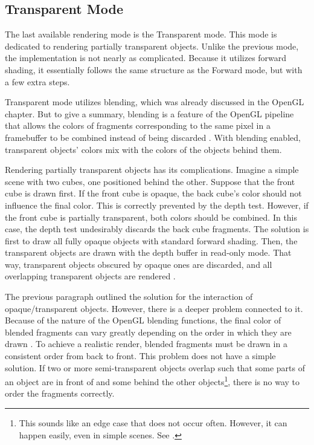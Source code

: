 \documentclass[
  digital,     %
  oneside,     %
  nosansbold,  %
  nocolorbold, %
  lof,         %
  lot,         %
]{fithesis4}
\begin{document}
\subsection{Transparent Mode}
The last available rendering mode is the Transparent mode. This mode is dedicated to rendering partially
transparent objects. Unlike the previous mode, the implementation is not nearly as complicated.
Because it utilizes forward shading, it essentially follows the same structure as the Forward mode,
but with a few extra steps.

Transparent mode utilizes blending, which was already discussed in the OpenGL chapter.
But to give a summary, blending is a feature of the OpenGL pipeline that
allows the colors of fragments corresponding to the same pixel in a framebuffer to be combined
instead of being discarded \cite[p.251]{opengl-book}. With blending enabled,
transparent objects' colors mix with the colors of the objects behind them.

Rendering partially transparent objects has its complications. Imagine a simple scene
with two cubes, one positioned behind the other. Suppose
that the front cube is drawn first. If the front cube is opaque, the back cube's
color should not influence the final color. This is correctly prevented by the depth test.
However, if the front cube is partially transparent, both colors should be combined.
In this case, the depth test undesirably discards the back cube fragments.
The solution is first to draw all fully opaque objects with standard forward shading.
Then, the transparent objects are drawn with the depth buffer in read-only mode.
That way, transparent objects obscured by opaque ones are discarded, and all overlapping
transparent objects are rendered \cite[p.263]{opengl-book}.

The previous paragraph outlined the solution for the interaction of opaque/transparent
objects. However, there is a deeper problem connected to it.
Because of the nature of the OpenGL blending functions, the final color of blended
fragments can vary greatly depending on the order in which they are drawn \cite[p.263]{opengl-book}.
To achieve a realistic render, blended fragments must be drawn in a consistent
order from back to front. This problem does not have a simple solution.
If two or more semi-transparent objects overlap such that some parts of an object are
in front of and some behind the other objects\footnote{This sounds like an edge case that does not occur often.
However, it can happen easily, even in simple scenes. See \cite{alpha-sorting}.},
there is no way to order the fragments correctly.
\end{document}
